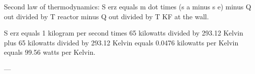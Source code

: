 Second law of thermodynamics:  
S erz equals m dot times (s a minus s e) minus Q out divided by T reactor minus Q out divided by T KF at the wall.  

S erz equals 1 kilogram per second times 65 kilowatts divided by 293.12 Kelvin plus 65 kilowatts divided by 293.12 Kelvin equals 0.0476 kilowatts per Kelvin equals 99.56 watts per Kelvin.  

---